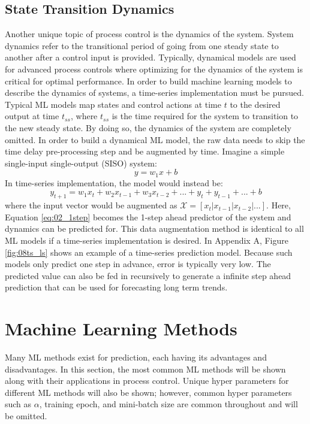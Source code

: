 \subsection{State Transition Dynamics}
Another unique topic of process control is the dynamics of the system. System dynamics refer to the transitional period of going from one steady state to another after a control input is provided. Typically, dynamical models are used for advanced process controls where optimizing for the dynamics of the system is critical for optimal performance.  In order to build machine learning models to describe the dynamics of systems, a time-series implementation must be pursued.  Typical ML models map states and control actions at time $t$ to the desired output at time $t_{ss}$, where $t_{ss}$ is the time required for the system to transition to the new steady state.  By doing so, the dynamics of the system are completely omitted.  In order to build a dynamical ML model, the raw data needs to skip the time delay pre-processing step and be augmented by time.  Imagine a simple single-input single-output (SISO) system:
\begin{equation}
    y = w_1x + b
\end{equation}
In time-series implementation, the model would instead be:
\begin{equation}
    y_{t + 1} = w_1x_{t} + w_2x_{t - 1} + w_3x_{t - 2} + ... + y_{t} + y_{t - 1} + ... + b
    \label{eq:02_1step}
\end{equation}
where the input vector would be augmented as $\mathcal{X} = [x_{t} | x_{t - 1} | x_{t - 2} | ... ]$. Here, Equation \ref{eq:02_1step} becomes the 1-step ahead predictor of the system and dynamics can be predicted for. This data augmentation method is identical to all ML models if a time-series implementation is desired. In Appendix A, Figure \ref{fig:08ts_ls} shows an example of a time-series prediction model.  Because such models only predict one step in advance, error is typically very low.  The predicted value can also be fed in recursively to generate a infinite step ahead prediction that can be used for forecasting long term trends.

\section{Machine Learning Methods}

Many ML methods exist for prediction, each having its advantages and disadvantages. In this section, the most common ML methods will be shown along with their applications in process control.  Unique hyper parameters for different ML methods will also be shown; however, common hyper parameters such as $\alpha$, training epoch, and mini-batch size are common throughout and will be omitted.

